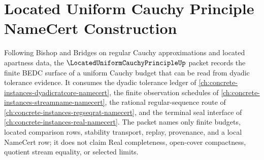 \chapter{Located Uniform Cauchy Principle NameCert Construction}
\label{ch:concrete-instances-located-uniform-cauchy-principle-namecert}

Following Bishop and Bridges on regular Cauchy approximations and located apartness data, the $\LocatedUniformCauchyPrincipleUp$ packet records the finite BEDC surface of a uniform Cauchy budget that can be read from dyadic tolerance evidence. It consumes the dyadic tolerance ledger of \autoref{ch:concrete-instances-dyadicratcore-namecert}, the finite observation schedules of \autoref{ch:concrete-instances-streamname-namecert}, the rational regular-sequence route of \autoref{ch:concrete-instances-regseqrat-namecert}, and the terminal seal interface of \autoref{ch:concrete-instances-real-namecert}. The packet names only finite budgets, located comparison rows, stability transport, replay, provenance, and a local NameCert row; it does not claim Real completeness, open-cover compactness, quotient stream equality, or selected limits.

